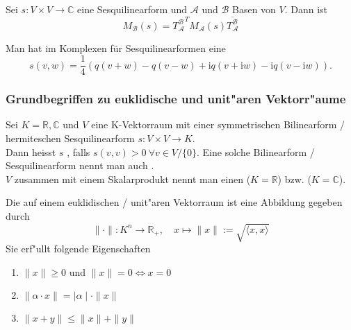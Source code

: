 \documentclass[9pt, a4paper, twocolumn, landscape]{article}
\begin{document}
\begin{theorem} 
Sei $s : V \times V \rightarrow \mathbb{C}$ eine Sesquilinearform und $\mathcal{A}$ und  $\mathcal{B}$ Basen von $V$. Dann ist
\begin{equation*}
M_\mathcal{B}(s) = {T^\mathcal{B}_\mathcal{A}}^T M_\mathcal{A}(s) \overline{T^\mathcal{B}_\mathcal{A}}
\end{equation*}
\end{theorem}





\begin{theorem} 
Man hat im Komplexen für Sesquilinearformen eine 
\begin{equation*}
s(v, w)=\frac{1}{4}(q(v+w)-q(v-w)+\mathrm{i} q(v+\mathrm{i} w)-\mathrm{i} q(v-\mathrm{i} w)).
\end{equation*}
\end{theorem}




\subsubsection{Grundbegriffen zu euklidische  und unit"aren Vektorr"aume}
\begin{definition}
Sei $K = \mathbb{R}, \mathbb{C}$ und $V$ eine K-Vektorraum mit einer symmetrischen Bilinearform / hermiteschen Sesquilinearform $s : V \times V \rightarrow K$. 
\\ Dann heisst $s$ , falls $s(v, v) > 0 \ \forall v \in V/\{0\}$.
Eine solche Bilinearform / Sesquilinearform nennt man auch .
\\$V$ zusammen mit einem Skalarprodukt nennt man einen  ($K = \mathbb{R}$) bzw.  ($K = \mathbb{C}$).
\end{definition}

\begin{definition}
Die  auf einem euklidischen / unit"aren Vektorraum ist eine Abbildung gegeben durch
\begin{equation*}
 \|\cdot\|: K^{n} \rightarrow \mathbb{R}_{+}, \quad x \mapsto\|x\|:=\sqrt{\langle x, x\rangle}
\end{equation*}
Sie erf"ullt folgende Eigenschaften
\begin{enumerate}
\item $\|x\| \geq 0$ und $\|x\| = 0 \Leftrightarrow x= 0$
\item $ \| \alpha \cdot x \| = \mid\alpha \mid \cdot \|x \| $ 
\item $\|x+y\| \leq\|x\|+\|y\|$
\end{enumerate}
\end{definition}
\end{document}
